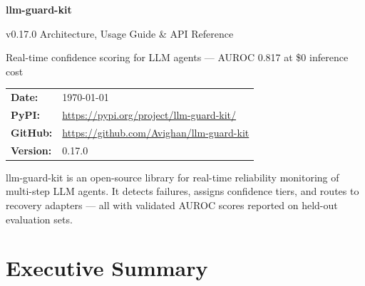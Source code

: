\documentclass[11pt,a4paper]{article}
\begin{document}
\begin{titlepage}
\thispagestyle{empty}

\vspace*{2.5cm}

{\color{white}\Huge\bfseries llm-guard-kit}

\vspace{0.5cm}
{\color{white!80}\Large v0.17.0 Architecture, Usage Guide \& API Reference}

\vspace{1.2cm}
\noindent\colorbox{warning!90}{%
  \parbox{0.9\textwidth}{\color{white}\centering\large
    Real-time confidence scoring for LLM agents ---
    AUROC 0.817 at \$0 inference cost
  }%
}

\vspace{3.5cm}

\begin{tabular}{ll}
  \textbf{Date:}   & \today \\[4pt]
  \textbf{PyPI:}   & \url{https://pypi.org/project/llm-guard-kit/} \\[4pt]
  \textbf{GitHub:} & \url{https://github.com/Avighan/llm-guard-kit} \\[4pt]
  \textbf{Version:} & 0.17.0 \\
\end{tabular}

\vfill

{\small\color{gray}
  llm-guard-kit is an open-source library for real-time reliability
  monitoring of multi-step LLM agents. It detects failures, assigns
  confidence tiers, and routes to recovery adapters --- all with
  validated AUROC scores reported on held-out evaluation sets.
}
\end{titlepage}

\newpage
\tableofcontents
\newpage

\section{Executive Summary}
\end{document}
